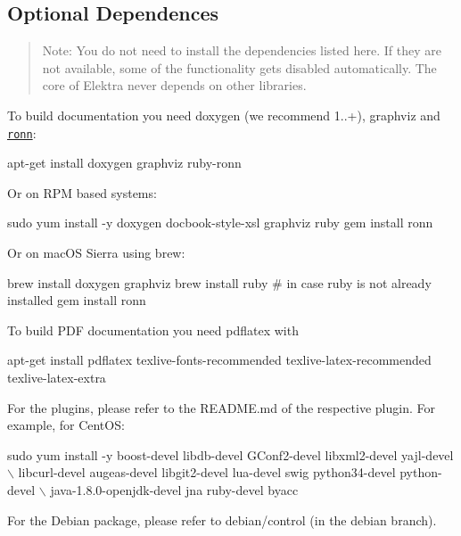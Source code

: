 \subsection*{Optional Dependences}

\begin{quote}
Note\+: You do not need to install the dependencies listed here. If they are not available, some of the functionality gets disabled automatically. The core of Elektra never depends on other libraries. \end{quote}


To build documentation you need doxygen (we recommend 1..+), graphviz and \href{https://github.com/rtomayko/ronn/blob/master/INSTALLING#files}{\tt ronn}\+:


\begin{DoxyCode}
apt-get install doxygen graphviz ruby-ronn
\end{DoxyCode}


Or on R\+PM based systems\+:


\begin{DoxyCode}
sudo yum install -y doxygen docbook-style-xsl graphviz ruby
gem install ronn
\end{DoxyCode}


Or on mac\+OS Sierra using brew\+:


\begin{DoxyCode}
brew install doxygen graphviz
brew install ruby # in case ruby is not already installed
gem install ronn
\end{DoxyCode}


To build P\+DF documentation you need {\ttfamily pdflatex} with


\begin{DoxyCode}
apt-get install pdflatex texlive-fonts-recommended texlive-latex-recommended texlive-latex-extra
\end{DoxyCode}


For the plugins, please refer to the R\+E\+A\+D\+M\+E.\+md of the respective plugin. For example, for Cent\+OS\+:


\begin{DoxyCode}
sudo yum install -y boost-devel libdb-devel GConf2-devel libxml2-devel yajl-devel   \(\backslash\)
libcurl-devel augeas-devel libgit2-devel lua-devel swig python34-devel python-devel \(\backslash\)
java-1.8.0-openjdk-devel jna ruby-devel byacc
\end{DoxyCode}


For the Debian package, please refer to debian/control (in the debian branch).

